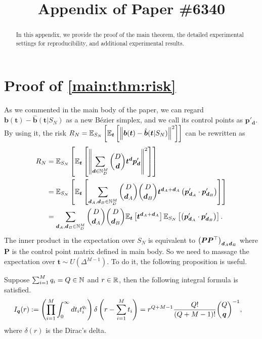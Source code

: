 \documentclass{article}
\title{Appendix of Paper \#6340}
\begin{document}
\maketitle

\begin{abstract}
In this appendix, we provide the proof of the main theorem, the detailed experimental settings for reproducibility, and additional experimental results.
\end{abstract}

\appendix
\section{Proof of \texorpdfstring{\cref{main:thm:risk}}{theorem 2}}\label{sec:proof-of-main-theorem}
As we commented in the main body of the paper, we can regard $\bm b (\bm t) - \hat{\bm b} (\bm t | S_N)$ as a new B\'ezier simplex, and we call its control points as $\bm p'_{\bm d}$.
By using it, the risk $R_N = \mathbb{E}_{S_N} \left[\mathbb{E}_{\bm t} \left[\left\| \bm b (\bm t) - \hat{\bm b} (\bm t | S_N) \right\|^2 \right] \right]$ can be rewritten as
\begin{align}
R_N
&=
\E_{S_N}
\sqbra{
\E_{\bm t}
\sqbra{
\norm{
\sum_{\bm d \in \N_D^M}
\binom{D}{\bm d}
\bm t^{\bm d} \bm p_{\bm d}'
}^2
}
}
\notag \\
&=
\E_{S_N}
\sqbra{
\E_{\bm t}
\sqbra{
\sum_{\bm d_A, \bm d_B \in \N_D^M}
\binom{D}{\bm d_A}
\binom{D}{\bm d_B}
\bm t^{\bm d_A + \bm d_A } 
\paren{
\bm p_{\bm d_A}'
\cdot
\bm p_{\bm d_B}'
}
}
}
\notag \\
&= %
\sum_{\bm d_A, \bm d_B \in \N_D^M}
\binom{D}{\bm d_A}
\binom{D}{\bm d_B}
\E_{\bm t}
\sqbra{
\bm t^{\bm d_A + \bm d_A } 
}
\E_{S_N}
\sqbra{
\paren{
\bm p_{\bm d_A}'
\cdot
\bm p_{\bm d_B}'
}
}
.
\label{eqn:RN_in_supp}
\end{align}
The inner product in the expectation over $S_N$ is equivalent to $\left( \bm P \bm P^\top \right)_{\bm d_A \bm d_B}$ where $\bm P$ is the control point matrix defined in main body.
So we need to massage the expectation over $\bm t \sim U(\Delta^{M-1})$.
To do it, the following proposition is useful.
\begin{prop}\label{thm:integ_formula}
Suppose $\sum_{i=1}^M q_i = Q \in \mathbb{N}$ and $r \in \mathbb{R}$, then the following integral formula is satisfied.
\begin{align}
I_{\bm q} (r)
&:=
\paren{
\prod_{i=1}^M
\int_0^\infty
 dt_i t_i^{q_i}
}
\delta \paren{
r - \sum_{i=1}^M t_i
}
= %
r^{Q+M-1} \frac{Q!}{(Q+M-1)! } %
\binom{Q}{\bm q}^{-1}
,
\end{align}
where $\delta (r)$ is the Dirac's delta.
\end{prop}
\end{document}
